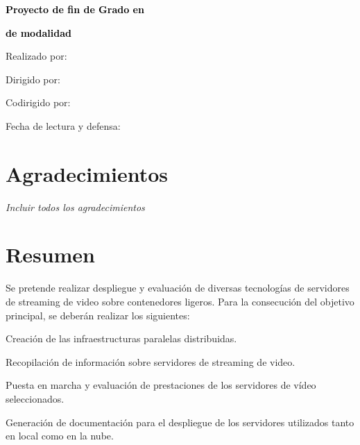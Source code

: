 \documentclass[12pt]{book}
\begin{document}
\begin{titlepage}
\begin{center}

    {\bfseries\Huge \textcolor{black}{\PFGtitulo} \par}
    \vfill
    {\bfseries\Large \textcolor{black}{Proyecto de fin de Grado en \PFGgrado} \par}
    {\bfseries\Large \textcolor{black}{de modalidad \PFGmodalidad} \par}
\end{center}

\vspace*{5cm}
{\Large Realizado por: \PFGautor \par}
{\Large Dirigido por: \PFGdirector \par}
\ifdefined\PFGcodirector
  {\Large Codirigido por: \PFGcodirector \par}
\fi%

\vfill
{\Large Fecha de lectura y defensa: \PFGfechadefensa \par}

\end{titlepage}


\chapter*{Agradecimientos}
\thispagestyle{empty}
\begin{flushright}
\textit{Incluir todos los agradecimientos}
\end{flushright}

\chapter*{Resumen} %

Se pretende realizar despliegue y evaluación de diversas tecnologías de servidores de streaming de video sobre contenedores ligeros. Para la consecución del objetivo principal, se deberán realizar los siguientes:
\begin{list}{·}{}
	\item Creación de las infraestructuras paralelas distribuidas.
	\item Recopilación de información sobre servidores de streaming de video.
	\item Puesta en marcha y evaluación de prestaciones de los servidores de vídeo seleccionados.
	\item Generación de documentación para el despliegue de los servidores utilizados tanto en local como en la nube.
\end{list}
\end{document}
